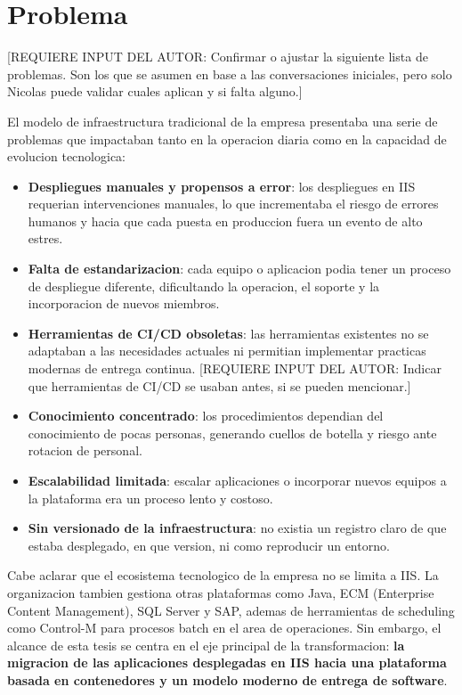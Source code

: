 \hypertarget{problema}{%
\section{Problema}\label{problema}}

{[}REQUIERE INPUT DEL AUTOR: Confirmar o ajustar la siguiente lista de
problemas. Son los que se asumen en base a las conversaciones iniciales,
pero solo Nicolas puede validar cuales aplican y si falta alguno.{]}

El modelo de infraestructura tradicional de la empresa presentaba una
serie de problemas que impactaban tanto en la operacion diaria como en
la capacidad de evolucion tecnologica:

\begin{itemize}
\tightlist
\item
  \textbf{Despliegues manuales y propensos a error}: los despliegues en
  IIS requerian intervenciones manuales, lo que incrementaba el riesgo
  de errores humanos y hacia que cada puesta en produccion fuera un
  evento de alto estres.
\item
  \textbf{Falta de estandarizacion}: cada equipo o aplicacion podia
  tener un proceso de despliegue diferente, dificultando la operacion,
  el soporte y la incorporacion de nuevos miembros.
\item
  \textbf{Herramientas de CI/CD obsoletas}: las herramientas existentes
  no se adaptaban a las necesidades actuales ni permitian implementar
  practicas modernas de entrega continua. {[}REQUIERE INPUT DEL AUTOR:
  Indicar que herramientas de CI/CD se usaban antes, si se pueden
  mencionar.{]}
\item
  \textbf{Conocimiento concentrado}: los procedimientos dependian del
  conocimiento de pocas personas, generando cuellos de botella y riesgo
  ante rotacion de personal.
\item
  \textbf{Escalabilidad limitada}: escalar aplicaciones o incorporar
  nuevos equipos a la plataforma era un proceso lento y costoso.
\item
  \textbf{Sin versionado de la infraestructura}: no existia un registro
  claro de que estaba desplegado, en que version, ni como reproducir un
  entorno.
\end{itemize}

Cabe aclarar que el ecosistema tecnologico de la empresa no se limita a
IIS. La organizacion tambien gestiona otras plataformas como Java, ECM
(Enterprise Content Management), SQL Server y SAP, ademas de
herramientas de scheduling como Control-M para procesos batch en el area
de operaciones. Sin embargo, el alcance de esta tesis se centra en el
eje principal de la transformacion: \textbf{la migracion de las
aplicaciones desplegadas en IIS hacia una plataforma basada en
contenedores y un modelo moderno de entrega de software}.

